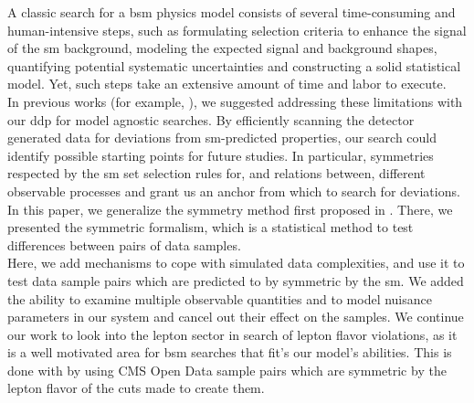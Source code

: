 \documentclass[paper/ddppaper2.tex]{subfiles}
\begin{document}
A classic search for a \gls{bsm} physics model \cite{ATLAS_Higgs_2012} consists of several time-consuming and human-intensive steps, such as formulating selection criteria to enhance the signal of the \gls{sm} background, modeling the expected signal and background shapes, quantifying potential systematic uncertainties and constructing a solid statistical model. Yet, such steps take an extensive amount of time and labor to execute. \\

In previous works (for example, \cite{Volkovich_2022_DDP, Birman_2022_Symmetries, LastDDPPaper}), we suggested addressing these limitations with our \gls{ddp} for model agnostic searches. By efficiently scanning the detector generated data for deviations from \gls{sm}-predicted properties, our search could identify possible starting points for future studies. In particular, symmetries respected by the \gls{sm} set selection rules for, and relations between, different observable processes and grant us an anchor from which to search for deviations. In this paper, we generalize the symmetry method first proposed in \cite{LastDDPPaper}. There, we presented the symmetric formalism, which is a statistical method to test differences between pairs of data samples.\\

Here, we add mechanisms to cope with simulated data complexities, and use it to test data sample pairs which are predicted to by symmetric by the \gls{sm}. We added the ability to examine multiple observable quantities and to model nuisance parameters in our system and cancel out their effect on the samples. We continue our work to look into the lepton sector in search of lepton flavor violations, as it is a well motivated area for \gls{bsm} searches that fit's our model's abilities. This is done with by using CMS Open Data sample pairs which are symmetric by the lepton flavor of the cuts made to create them.
\end{document}
